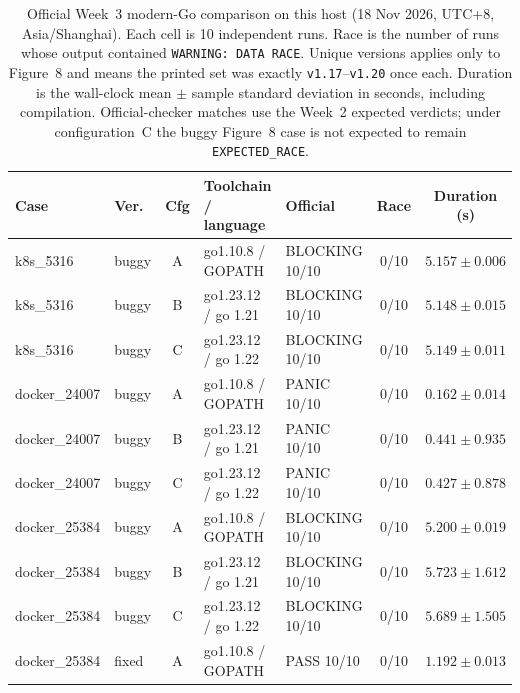 \begin{landscape}
\begin{table}[p]
  \centering
  \caption{Official Week~3 modern-Go comparison on this host
    (18 Nov 2026, UTC+8, Asia/Shanghai).
    Each cell is 10 independent runs.
    Race is the number of runs whose output contained \texttt{WARNING: DATA RACE}.
    Unique versions applies only to Figure~8 and means the printed set was
    exactly \texttt{v1.17}--\texttt{v1.20} once each.
    Duration is the wall-clock mean $\pm$ sample standard deviation in seconds,
    including compilation.
    Official-checker matches use the Week~2 expected verdicts; under
    configuration~C the buggy Figure~8 case is not expected to remain
    \texttt{EXPECTED\_RACE}.}
  \label{tab:extension-outcomes}
  \footnotesize
  \setlength{\tabcolsep}{5pt}
  \renewcommand{\arraystretch}{1.08}
  \begin{tabularx}{\linewidth}{L{2.5cm}L{1.2cm}c L{4.1cm}Ycc}
    \toprule
    Case & Ver. & Cfg & Toolchain / language & Official & Race & Duration (s) \\
    \midrule
    k8s\_5316     & buggy & A & go1.10.8 / GOPATH     & BLOCKING 10/10 & 0/10 & $5.157 \pm 0.006$ \\
    k8s\_5316     & buggy & B & go1.23.12 / go 1.21  & BLOCKING 10/10 & 0/10 & $5.148 \pm 0.015$ \\
    k8s\_5316     & buggy & C & go1.23.12 / go 1.22  & BLOCKING 10/10 & 0/10 & $5.149 \pm 0.011$ \\
    docker\_24007 & buggy & A & go1.10.8 / GOPATH     & PANIC 10/10    & 0/10 & $0.162 \pm 0.014$ \\
    docker\_24007 & buggy & B & go1.23.12 / go 1.21  & PANIC 10/10    & 0/10 & $0.441 \pm 0.935$ \\
    docker\_24007 & buggy & C & go1.23.12 / go 1.22  & PANIC 10/10    & 0/10 & $0.427 \pm 0.878$ \\
    docker\_25384 & buggy & A & go1.10.8 / GOPATH     & BLOCKING 10/10 & 0/10 & $5.200 \pm 0.019$ \\
    docker\_25384 & buggy & B & go1.23.12 / go 1.21  & BLOCKING 10/10 & 0/10 & $5.723 \pm 1.612$ \\
    docker\_25384 & buggy & C & go1.23.12 / go 1.22  & BLOCKING 10/10 & 0/10 & $5.689 \pm 1.505$ \\
    docker\_25384 & fixed & A & go1.10.8 / GOPATH     & PASS 10/10     & 0/10 & $1.192 \pm 0.013$ \\

\end{tabularx}
\end{table}
\end{landscape}
